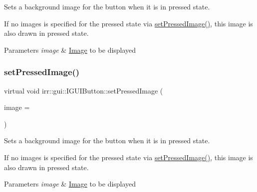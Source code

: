 Sets a background image for the button when it is in pressed state. 

If no images is specified for the pressed state via \hyperlink{classirr_1_1gui_1_1IGUIButton_a10389917530aa2f4a3008330c0695aad}{set\+Pressed\+Image()}, this image is also drawn in pressed state. 
\begin{DoxyParams}{Parameters}
{\em image} & \hyperlink{classImage}{Image} to be displayed \\
\hline
\end{DoxyParams}
\mbox{\label{classirr_1_1gui_1_1IGUIButton_a10389917530aa2f4a3008330c0695aad}} 
\subsubsection{\texorpdfstring{set\+Pressed\+Image()}{setPressedImage()}\hspace{0.1cm}{\footnotesize\ttfamily [2/4]}}
{\footnotesize\ttfamily virtual void irr\+::gui\+::\+I\+G\+U\+I\+Button\+::set\+Pressed\+Image (\begin{DoxyParamCaption}\item[{\hyperlink{classirr_1_1video_1_1ITexture}{video\+::\+I\+Texture} $\ast$}]{image = {} }\end{DoxyParamCaption})\hspace{0.3cm}{\ttfamily [pure virtual]}}



Sets a background image for the button when it is in pressed state. 

If no images is specified for the pressed state via \hyperlink{classirr_1_1gui_1_1IGUIButton_a10389917530aa2f4a3008330c0695aad}{set\+Pressed\+Image()}, this image is also drawn in pressed state. 
\begin{DoxyParams}{Parameters}
{\em image} & \hyperlink{classImage}{Image} to be displayed \\
\hline
\end{DoxyParams}
\mbox{\label{classirr_1_1gui_1_1IGUIButton_a08019647ec3e08984d795b3c564d457e}} 
